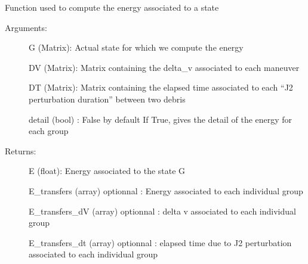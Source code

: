 \documentclass[letterpaper,10pt,english]{sphinxmanual}
\begin{document}
\begin{fulllineitems}
\label{\detokenize{regroupement/optimizer:regroupement.optimizer.energy_computation.energy_computation}}
Function used to compute the energy associated to a state
\begin{description}
\item[{Arguments:}] \leavevmode
G (Matrix): Actual state for which we compute the energy

DV (Matrix): Matrix containing the delta\_v associated to each maneuver

DT (Matrix): Matrix containing the elapsed time associated to each “J2 perturbation duration” between two debris

detail (bool) : False by default \sphinxhyphen{} If True, gives the detail of the energy for each group

\item[{Returns: }] \leavevmode
E (float): Energy associated to the state G

E\_transfers (array) \sphinxhyphen{} optionnal : Energy associated to each individual group

E\_transfers\_dV (array) \sphinxhyphen{} optionnal : delta v associated to each individual group

E\_transfers\_dt (array) \sphinxhyphen{} optionnal : elapsed time due to J2 perturbation associated to each individual group

\end{description}

\end{fulllineitems}

\end{document}
